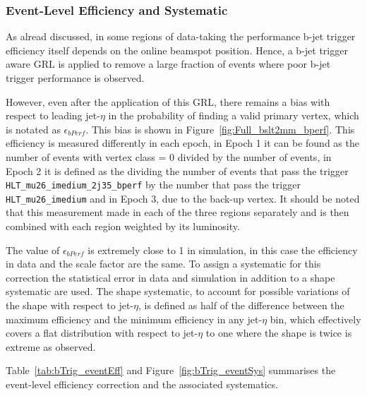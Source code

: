 \FloatBarrier
\newpage

\subsubsection{Event-Level Efficiency and Systematic}
\label{sec:trig-eventLevelEff}

As alread discussed, in some regions of data-taking the performance
b-jet trigger efficiency itself
depends on the online beamspot position.
Hence, a b-jet trigger aware GRL is applied to remove a large fraction of
events where poor b-jet trigger performance is observed.

However, even after the application of this GRL,
there remains a bias with respect to leading jet-$\eta$ in the
probability of finding a valid primary vertex, which is notated as $\epsilon_{bPerf}$.
This bias is shown in Figure~\ref{fig:Full_bslt2mm_bperf}.
This efficiency is measured differently in each epoch,
in Epoch 1 it can be found as the number of events with vertex class = 0 divided by the number of events,
in Epoch 2 it is defined as the dividing the number of events that pass the trigger
\verb|HLT_mu26_imedium_2j35_bperf| by the number that pass the trigger \verb|HLT_mu26_imedium|
and in Epoch 3, due to the back-up vertex.
It should be noted that this measurement made in each of the three regions separately and is then combined with each region weighted by its luminosity.

The value of $\epsilon_{bPerf}$ is extremely close to 1 in simulation, in this case the efficiency in data and the scale factor are the same.
To assign a systematic for this correction the statistical error in data and simulation in addition to a shape systematic are used.
The shape systematic, to account for possible variations of the shape with respect to jet-$\eta$,
is defined as half of the difference between the maximum efficiency and the minimum efficiency in any jet-$\eta$ bin,
which effectively covers a flat distribution with respect to jet-$\eta$ to one where the shape is twice is extreme as observed.

Table~\ref{tab:bTrig_eventEff} and Figure~\ref{fig:bTrig_eventSys}
summarises the event-level efficiency correction and the associated systematics.

